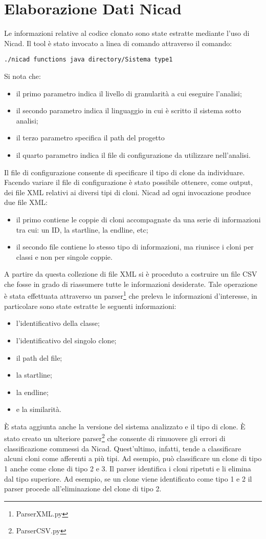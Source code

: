 \section{Elaborazione Dati Nicad}
Le informazioni relative al codice clonato sono state estratte mediante l'uso di Nicad. Il tool è stato invocato a linea di comando attraverso il comando:
\begin{verbatim}
./nicad functions java directory/Sistema type1
\end{verbatim}
Si nota che:
\begin{itemize}
	\item il primo parametro indica il livello di granularità a cui eseguire l'analisi;
	\item il secondo parametro indica il linguaggio in cui è scritto il sistema sotto analisi;
	\item il terzo parametro specifica il path del progetto
	\item il quarto parametro indica il file di configurazione da utilizzare nell'analisi.
\end{itemize}
Il file di configurazione consente di specificare il tipo di clone da individuare. Facendo variare il file di configurazione è stato possibile ottenere, come output, dei file XML relativi ai diversi tipi di cloni. Nicad ad ogni invocazione produce due file XML:
\begin{itemize}
	\item il primo contiene le coppie di cloni accompagnate da una serie di informazioni tra cui: un ID, la startline, la endline, etc;
	\item il secondo file contiene lo stesso tipo di informazioni, ma riunisce i cloni per classi e non per singole coppie.
\end{itemize}
A partire da questa collezione di file XML si è proceduto a costruire un file CSV che fosse in grado di riassumere tutte le informazioni desiderate. Tale operazione è stata effettuata attraverso un parser\footnote{ParserXML.py} che preleva le informazioni d'interesse, in particolare sono state estratte le seguenti informazioni:
\begin{itemize}
\item l'identificativo della classe;
\item l'identificativo del singolo clone;
\item il path del file;
\item la startline;
\item la endline;
\item e la similarità.
\end{itemize} 
È stata aggiunta anche la versione del sistema analizzato e il tipo di clone. 
È stato creato un ulteriore parser\footnote{ParserCSV.py} che consente di rimuovere gli errori di classificazione commessi da Nicad. Quest'ultimo, infatti, tende a classificare alcuni cloni come afferenti a più tipi. Ad esempio, può classificare un clone di tipo 1 anche come clone di tipo 2 e 3. Il parser identifica i cloni ripetuti e li elimina dal tipo superiore. Ad esempio, se un clone viene identificato come tipo 1 e 2 il parser procede all'eliminazione del clone di tipo 2.